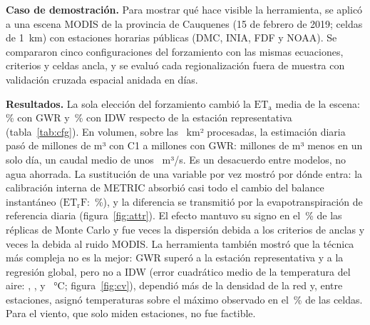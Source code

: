 \documentclass[10pt,a4paper]{article}
\newcommand{\ETa}{\mathrm{ET_a}}
\newcommand{\ETrF}{\mathrm{ET_rF}}
\begin{document}
\textbf{Caso de demostración.} Para mostrar qué hace visible la herramienta, se aplicó a una escena MODIS de la provincia de Cauquenes (15 de febrero de 2019; \SceneCellsValid{} celdas de 1~km) con \NStations{} estaciones horarias públicas (DMC, INIA, FDF y NOAA). Se compararon cinco configuraciones del forzamiento con las mismas ecuaciones, criterios y celdas ancla, y se evaluó cada regionalización fuera de muestra con validación cruzada espacial anidada en \NCVDays{} días.

\textbf{Resultados.} La sola elección del forzamiento cambió la $\ETa$ media de la escena: \DEtaCThreeGWRPct\,\% con GWR y \DEtaCTwoIDWPct\,\% con IDW respecto de la estación representativa (tabla~\ref{tab:cfg}). En volumen, sobre las \VolArea~km² procesadas, la estimación diaria pasó de \VolCOne{} millones de m³ con C1 a \VolCThreeGWR{} millones con GWR: \VolDiffAbsCThreeGWR{} millones de m³ menos en un solo día, un caudal medio de unos \VolDiffFlowCThreeGWR~m³/s. Es un desacuerdo entre modelos, no agua ahorrada. La sustitución de una variable por vez mostró por dónde entra: la calibración interna de METRIC absorbió casi todo el cambio del balance instantáneo ($\ETrF$: \DEtrfCThreeGWRPct\,\%), y la diferencia se transmitió por la evapotranspiración de referencia diaria (figura~\ref{fig:attr}). El efecto mantuvo su signo en el \SAEffSign\,\% de las réplicas de Monte Carlo y fue \RatioSA{} veces la dispersión debida a los criterios de anclas y \RatioSB{} veces la debida al ruido MODIS. La herramienta también mostró que la técnica más compleja no es la mejor: GWR superó a la estación representativa y a la regresión global, pero no a IDW (error cuadrático medio de la temperatura del aire: \CVTaCOneRmse, \CVTaCTwoOLSRmse, \CVTaCThreeGWRRmse{} y \CVTaCTwoIDWRmse~°C; figura~\ref{fig:cv}), dependió más de la densidad de la red y, entre estaciones, asignó temperaturas sobre el máximo observado en el \RangeTaCThreeGWRAbove\,\% de las celdas. Para el viento, que solo miden \NStationsWind{} estaciones, no fue factible.
\end{document}
